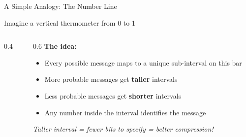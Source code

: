\documentclass[aspectratio=169,12pt]{beamer}
\begin{document}
\begin{frame}{A Simple Analogy: The Number Line}
    \begin{center}
        \Large{Imagine a vertical thermometer from 0 to 1}
    \end{center}
    
    \vspace{0.3cm}
    \begin{columns}
        \begin{column}{0.4\textwidth}
            \begin{center}
            \end{center}
        \end{column}
        \begin{column}{0.6\textwidth}
            \textbf{The idea:}
            \begin{itemize}
                \item Every possible message maps to a unique sub-interval on this bar
                \item More probable messages get \textbf{taller} intervals
                \item Less probable messages get \textbf{shorter} intervals
                \item Any number inside the interval identifies the message
            \end{itemize}
            
            \vspace{0.3cm}
            \textit{Taller interval = fewer bits to specify = better compression!}
        \end{column}
    \end{columns}
\end{frame}
\end{document}
